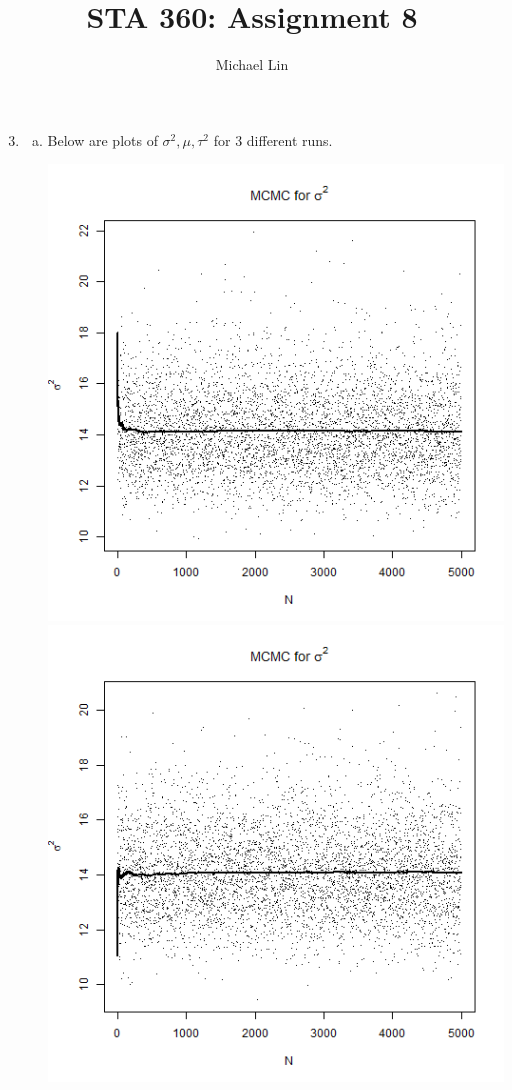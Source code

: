 \documentclass{article}
\title{STA 360: Assignment 8}
\author{Michael Lin}
\begin{document}
\maketitle

\begin{enumerate}[8.1]
\setcounter{enumi}{2}
\item
\begin{enumerate}[(a)]
\item Below are plots of $\sigma^2, \mu, \tau^2$ for 3 different runs.

\includegraphics[scale = 0.3]{sig.png}
\includegraphics[scale = 0.3]{sig-a.png}

\end{enumerate}
\end{enumerate}
\end{document}
